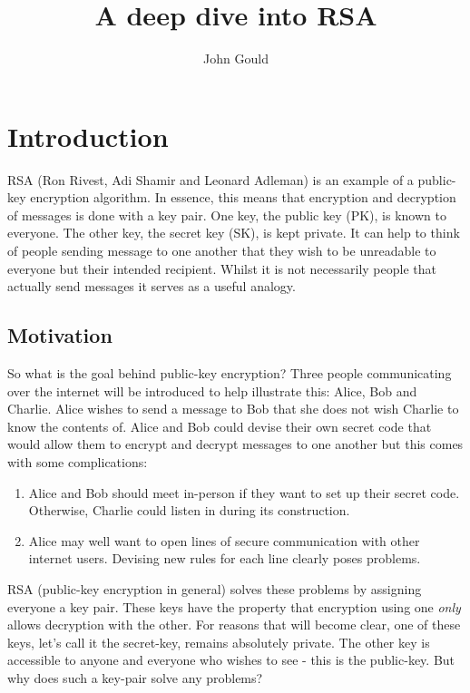 \documentclass{amsart}
\begin{document}
\author{John Gould}
\title{A deep dive into RSA}
\maketitle

\section[intro]{Introduction}

RSA (Ron Rivest, Adi Shamir and Leonard Adleman) is an example of a public-key encryption algorithm. In essence, this means that encryption and decryption of messages is done with a key pair. One key, the public key (PK), is known to everyone. The other key, the secret key (SK), is kept private. It can help to think of people sending message to one another that they wish to be unreadable to everyone but their intended recipient. Whilst it is not necessarily people that actually send messages it serves as a useful analogy.

\subsection[mot]{Motivation}

So what is the goal behind public-key encryption? Three people communicating over the internet will be introduced to help illustrate this: Alice, Bob and Charlie. Alice wishes to send a message to Bob that she does not wish Charlie to know the contents of. Alice and Bob could devise their own secret code that would allow them to encrypt and decrypt messages to one another but this comes with some complications:
\begin{enumerate}
    \item Alice and Bob should meet in-person if they want to set up their secret code. Otherwise, Charlie could listen in during its construction.
    \item Alice may well want to open lines of secure communication with other internet users. Devising new rules for each line clearly poses problems.
\end{enumerate}
RSA (public-key encryption in general) solves these problems by assigning everyone a key pair. These keys have the property that encryption using one \textit{only} allows decryption with the other. For reasons that will become clear, one of these keys, let's call it the secret-key, remains absolutely private. The other key is accessible to anyone and everyone who wishes to see - this is the public-key. But why does such a key-pair solve any problems?
\end{document}
